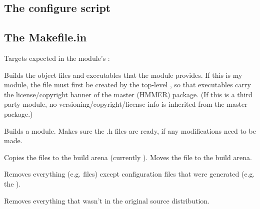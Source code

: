 \subsection{The configure script}


\subsection{The Makefile.in}

Targets expected in the module's :

\begin{wideitem}
\item{}

Builds the object files and executables that the module provides.  If
this is my module, the file  must first be created by
the top-level , so that executables carry the
license/copyright banner of the master (HMMER) package. (If this is a
third party module, no versioning/copyright/license info is inherited
from the master package.)

\item{}
Builds a  module. Makes sure the .h files are 
ready, if any modifications need to be made. 

\item{}
Copies the  files to the build arena (currently 
). Moves the  file
to the build arena.

\item{}
Removes everything (e.g.  files) except configuration files
that were generated (e.g. the ).

\item{}
Removes everything that wasn't in the original source distribution.
\end{wideitem}